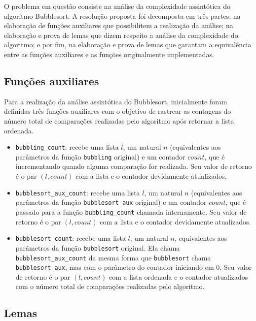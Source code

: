 
O problema em questão consiste na análise da complexidade
assintótica do algoritmo Bubblesort. A resolução proposta
foi decomposta em três partes: na elaboração de funções
auxiliares que possibilitem a realização da análise;
na elaboração e prova de lemas que dizem respeito a análise
da complexidade do algoritmo; e por fim, na elaboração e prova
de lemas que garantam a equivalência entre as funções auxiliares
e as funções originalmente implementadas.

\subsection{Funções auxiliares}

Para a realização da análise assintótica do Bubblesort,
inicialmente foram definidas três funções auxiliares
com o objetivo de rastrear as contagens do número total
de comparações realizadas pelo algoritmo após retornar
a lista ordenada.

\begin{itemize}
\item \texttt{bubbling\_count}: recebe uma lista $l$, um
natural $n$ (equivalentes aos parâmetros da função
\texttt{bubbling} original) e um contador $count$, que é
incrementando quando alguma comparação for realizada.
Seu valor de retorno é o par $(l, count)$ com a lista e
o contador devidamente atualizados.
\item \texttt{bubblesort\_aux\_count}: recebe uma lista $l$,
um natural $n$ (equivalentes aos parâmetros da função
\texttt{bubblesort\_aux} original) e um contador $count$,
que é passado para a função \texttt{bubbling\_count}
chamada internamente. Seu valor de retorno é o par
$(l, count)$ com a lista e o contador devidamente
atualizados.
\item \texttt{bubblesort\_count}: recebe uma lista $l$,
um natural $n$, equivalentes aos parâmetros da função
\texttt{bubblesort} original. Ela chama
\texttt{bubblesort\_aux\_count} da mesma forma que
\texttt{bubblesort} chama \texttt{bubblesort\_aux},
mas com o parâmetro do contador iniciando em 0. Seu valor
de retorno é o par $(l, count)$ com a lista ordenada
e o contador atualizados com o número total de comparações
realizadas pelo algoritmo.
\end{itemize}

\subsection{Lemas}

